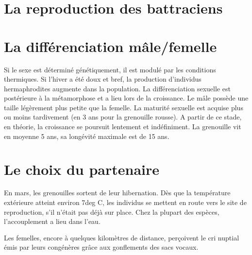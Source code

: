 \section{La reproduction des battraciens}



\section{La différenciation mâle/femelle}

Si le sexe est déterminé génétiquement, il est modulé par les conditions thermiques. Si l’hiver a été doux et bref, la production d’individus hermaphrodites augmente dans la population.
La différenciation sexuelle est postérieure à la métamorphose et a lieu lors de la croissance.
Le mâle possède une taille légèrement plus petite que la femelle.
La maturité sexuelle est acquise plus ou moins tardivement (en 3 ans pour la grenouille rousse). A partir de ce stade, en théorie, la croissance se poursuit lentement et indéfiniment. La grenouille vit en moyenne 5 ans, sa longévité maximale est de 15 ans.
        
\section{Le choix du partenaire}
En mars, les grenouilles sortent de leur hibernation.  Dès que la température extérieure atteint environ 7deg C, les individus se mettent en route vers le site de reproduction, s’il n’était pas déjà sur place. Chez la plupart des espèces, l’accouplement a lieu dans l’eau.

Les femelles, encore à quelques kilomètres de distance, perçoivent le cri nuptial émis par leurs congénères grâce aux gonflements des sacs vocaux.




 
